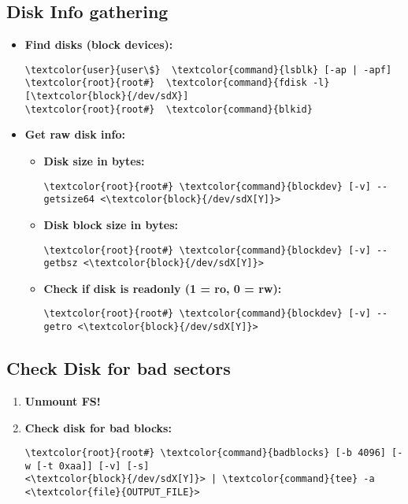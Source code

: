\documentclass[10pt, a4paper, onecolumn, openany]{book} %
\begin{document}
\subsection{Disk Info gathering}
\label{disk_info_gathering}
\begin{itemize}
    \item \textbf{Find disks (block devices):}
\begin{Verbatim}[commandchars=\\\{\}]
\textcolor{user}{user\$}  \textcolor{command}{lsblk} [-ap | -apf]
\textcolor{root}{root#}  \textcolor{command}{fdisk -l} [\textcolor{block}{/dev/sdX}]
\textcolor{root}{root#}  \textcolor{command}{blkid}
\end{Verbatim}
    \item \textbf{Get raw disk info:}
    \begin{itemize}
        \item \textbf{Disk size in bytes:}
\begin{Verbatim}[commandchars=\\\{\}]
\textcolor{root}{root#} \textcolor{command}{blockdev} [-v] --getsize64 <\textcolor{block}{/dev/sdX[Y]}>
\end{Verbatim}        
    \item \textbf{Disk block size in bytes:}
\begin{Verbatim}[commandchars=\\\{\}]
\textcolor{root}{root#} \textcolor{command}{blockdev} [-v] --getbsz <\textcolor{block}{/dev/sdX[Y]}>
\end{Verbatim}
    \item \textbf{Check if disk is readonly (1 = ro, 0 = rw):}
\begin{Verbatim}[commandchars=\\\{\}]
\textcolor{root}{root#} \textcolor{command}{blockdev} [-v] --getro <\textcolor{block}{/dev/sdX[Y]}>
\end{Verbatim}
    \end{itemize}
\end{itemize}
\subsection{Check Disk for bad sectors}
\begin{enumerate}
    \item \textbf{Unmount FS!}
    \item \textbf{Check disk for bad blocks:}
\begin{Verbatim}[commandchars=\\\{\}]
\textcolor{root}{root#} \textcolor{command}{badblocks} [-b 4096] [-w [-t 0xaa]] [-v] [-s] 
<\textcolor{block}{/dev/sdX[Y]}> | \textcolor{command}{tee} -a <\textcolor{file}{OUTPUT_FILE}>
\end{Verbatim}
\end{enumerate}
\end{document}
